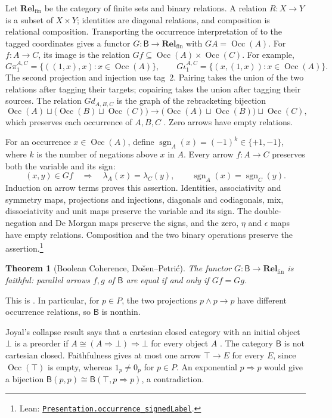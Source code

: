 \documentclass[11pt]{article}
\newtheorem{theorem}{Theorem}[section]
\newcommand{\B}{\mathsf B}
\newcommand{\Occ}{\operatorname{Occ}}
\newcommand{\Rel}{\mathbf{Rel}_{\mathrm{fin}}}
\begin{document}
Let $\Rel$ be the category of finite sets and binary relations.
A relation $R:X\to Y$ is a subset of $X\times Y$; identities are
diagonal relations, and composition is relational composition.
Transporting the occurrence interpretation of \cite{DP} to the
tagged coordinates gives a functor
$G:\B\to\Rel$ with $GA=\Occ(A)$. For $f:A\to C$, its image is
the relation $Gf\subseteq\Occ(A)\times\Occ(C)$.
For example,
\[
 G\pi_1^{A,C}=\{((1,x),x):x\in\Occ(A)\},\qquad
 G\iota_1^{A,C}=\{(x,(1,x)):x\in\Occ(A)\}.
\]
The second projection and injection use tag~$2$. Pairing takes the
union of the two relations after tagging their targets; copairing
takes the union after tagging their sources. The relation $Gd_{A,B,C}$
is the graph of the rebracketing bijection
\[
 \Occ(A)\sqcup\bigl(\Occ(B)\sqcup\Occ(C)\bigr)
 \longrightarrow
 \bigl(\Occ(A)\sqcup\Occ(B)\bigr)\sqcup\Occ(C),
\]
which preserves each occurrence of $A,B,C$
\cite[\S2.9, p.~60]{DP}. Zero arrows have empty relations.

For an occurrence $x\in\Occ(A)$, define
$\operatorname{sgn}_A(x)=(-1)^k\in\{+1,-1\}$, where $k$ is the
number of negations above $x$ in $A$. Every arrow $f:A\to C$
preserves both the variable and its sign:
\[
 (x,y)\in Gf\quad\Longrightarrow\quad
 \lambda_A(x)=\lambda_C(y),\qquad
 \operatorname{sgn}_A(x)=\operatorname{sgn}_C(y).
\]
Induction on arrow terms proves this assertion. Identities,
associativity and symmetry maps, projections and injections,
diagonals and codiagonals, mix, dissociativity and unit maps
preserve the variable and its sign. The double-negation and
De Morgan maps preserve the signs, and the zero,
$\eta$ and $\epsilon$ maps have empty relations. Composition and
the two binary operations preserve the assertion.\footnote{\raggedright Lean:
\href{https://github.com/flengyel/Dosen-Petric-Maximality/blob/5dbee39bea09539bd130f729e82636419f71f920/DosenPetric/PresentationSignedLabels.lean\#L73}{\texttt{Presentation.\allowbreak{}occurrence\_signedLabel}}.}

\begin{theorem}[Boolean Coherence, Do\v{s}en--Petri\'c]
\label{thm:coherence}
The functor $G:\B\to\Rel$ is faithful: parallel arrows $f,g$ of
$\B$ are equal if and only if $Gf=Gg$.
\end{theorem}

This is \cite[\S14.2, p.~321]{DP}. In particular, for $p\in P$, the
two projections $p\wedge p\to p$ have different occurrence
relations, so $\B$ is nonthin.

Joyal's collapse result says that a cartesian closed category with
an initial object $\bot$ is a preorder if
$A\cong(A\Rightarrow\bot)\Rightarrow\bot$ for every object $A$
\cite[\S14.3, p.~324]{DP}.
The category $\B$ is not cartesian closed. Faithfulness gives at most
one arrow $\top\to E$ for every $E$, since $\Occ(\top)$ is empty,
whereas $1_p\ne0_p$ for $p\in P$. An exponential $p\Rightarrow p$
would give a bijection $\B(p,p)\cong\B(\top,p\Rightarrow p)$,
a contradiction.
\end{document}
